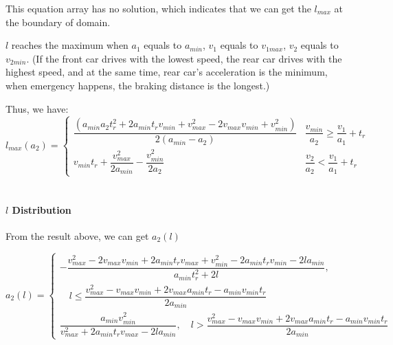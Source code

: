 This equation array has no solution, which indicates that we can get the $l_{max}$ at the boundary of domain.

$l$ reaches the maximum when $a_1$ equals to $a_{min}$, { }$v_1$ equals to $v_{1max}$, $v_2$ equals to $v_{2min}$. (If the front car drives with the lowest speed, the rear car drives with the highest speed, and at the same time, rear car's acceleration is the minimum, when emergency happens, the braking distance is the longest.)

Thus, we have:
\begin{displaymath}
l_{max}(a_2) = 
\left \{
\begin{array}{cl}
\dfrac{(a_{min}a_2t_r^2 + 2a_{min}t_rv_{min} + v_{max}^2 - 2v_{max}v_{min} + v_{min}^2)}{2(a_{min}-a_2)} & \dfrac{v_{min}}{a_2}  \geq \dfrac{v_1}{a_1} + t_r \\
v_{min} t_r + \dfrac{v_{max} ^ 2}{2a_{min}} -\dfrac{v_{min}^2}{2a_2} & \dfrac{v_2}{a_2}  < \dfrac{v_1}{a_1} + t_r
\end{array}
\right .
\end{displaymath}\\

\paragraph{$l${ } Distribution}
From the result above, we can get $a_2(l)$

\[ a_2(l) = \begin{cases}
-\dfrac{v_{max}^2 - 2v_{max}v_{min} + 2a_{min}t_rv_{max} + v_{min}^2 - 2a_{min}t_rv_{min} - 2la_{min}}{a_{min}t_r^2 + 2l}, 
\\

\quad l \leq \dfrac{v_{max}^2 - v_{max}v_{min} + 2v_{max}a_{min}t_r - a_{min} v_{min}t_r}{2a_{min}}\\
\dfrac{a_{min}v_{min}^2}{v_{max}^2 + 2a_{min}t_rv_{max} - 2la_{min}}, \quad  l > \dfrac{v_{max}^2 - v_{max}v_{min} + 2v_{max}a_{min}t_r - a_{min} v_{min}t_r}{2a_{min}}
\end{cases}\]
\\
